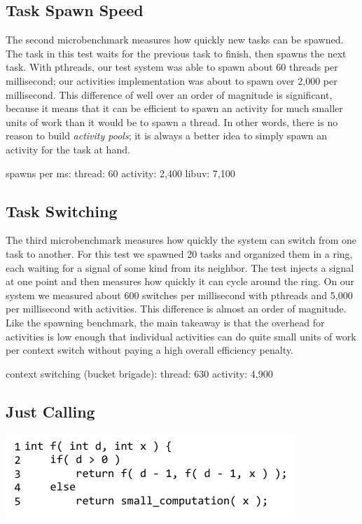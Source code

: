 \documentclass[10pt,preprint]{sigplanconf}
\begin{document}
\subsection{Task Spawn Speed}


The second microbenchmark measures how quickly new tasks can be spawned.
The task in this test waits for the previous task to finish, then spawns the next task.
With pthreads, our test system was able to spawn about 60 threads per millisecond; our activities implementation was about to spawn over 2,000 per millisecond.
This difference of well over an order of magnitude is significant, because it means that it can be efficient to spawn an activity for much smaller units of work than it would be to spawn a thread.
In other words, there is no reason to build \emph{activity pools}; it is always a better idea to simply spawn an activity for the task at hand.

spawns per ms: thread: 60 activity: 2,400 libuv: 7,100

\subsection{Task Switching}

The third microbenchmark measures how quickly the system can switch from one task to another.
For this test we spawned 20 tasks and organized them in a ring, each waiting for a signal of some kind from its neighbor.
The test injects a signal at one point and then measures how quickly it can cycle around the ring.
On our system we measured about 600 switches per millisecond with pthreads and 5,000 per millisecond with activities.
This difference is almost an order of magnitude.
Like the spawning benchmark, the main takeaway is that the overhead for activities is low enough that individual activities can do quite small units of work per context switch without paying a high overall efficiency penalty.

context switching (bucket brigade): thread: 630  activity: 4,900

\subsection{Just Calling}

{\raggedleft \includegraphics{just_calling_benchmark}}
\end{document}
